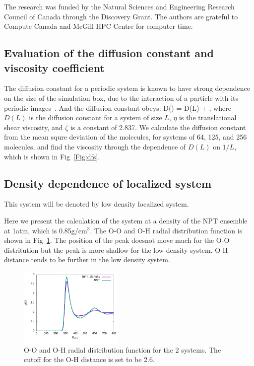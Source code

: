 \documentclass[aps,prl,reprint,amsmath,amssymb]{revtex4-1}
\begin{document}
The research was funded by the Natural Sciences and Engineering Research Council of Canada through the Discovery Grant. 
The authors are grateful to Compute Canada and McGill HPC Centre for computer time.



\else %

\subsection{Evaluation of the diffusion constant and viscosity coefficient} 

The diffusion constant for a periodic system is known to have strong dependence on the size of the simulation box, due to the interaction of a particle with its periodic images~\cite{dunweg1993molecular}. 
And the diffusion constant obeys:
%
\bea
D(\infty) = D(L) + ,
\eea
%
where $D(L)$ is the diffusion constant for a system of size $L$, $\eta$ is the translational shear viscosity, and $\zeta$ is a constant of 2.837. 
We calculate the diffusion constant from the mean squre deviation of the molecules, for systems of 64, 125, and 256 molecules, and find the viscosity through the dependence of $D(L)$ on $1/L$, which is shown in Fig~\ref{Fig:dfs}.

\subsection{Density dependence of localized system} 

This system will be denoted by low density localized system.

Here we present the calculation of the system at a density of the NPT ensemble at 1atm, which is 0.85g/cm$^3$. 
The O-O and O-H radial distribution function is shown in Fig~\ref{Fig:rdf_cp}. 
The position of the peak doesnot move much for the O-O distritution but the peak is more shallow for the low density system. 
O-H distance tends to be further in the low density system.

\begin{figure}
\includegraphics[width=0.45\textwidth]{rdf_NVT_CPDNVT.png}
\caption{O-O and O-H radial distribution function for the 2 systems. The cutoff for the O-H distance is set to be 2.6\Ang.}\label{Fig:rdf_cp}
\end{figure} 
\end{document}

